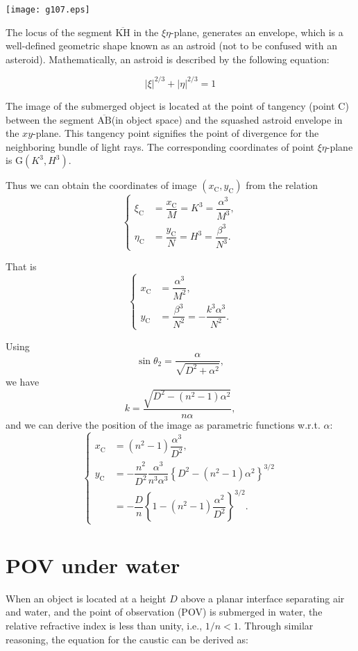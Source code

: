 \documentclass[twocolumn]{article}
\begin{document}
\hfill \texttt{[image: g107.eps]} \hfill\null

The locus of the segment $\overline{\mathrm{KH}}$ in the $\xi\eta$-plane, generates an envelope, which is a 
well-defined geometric shape known as an astroid (not to be confused with an asteroid). 
Mathematically, an astroid is described by the following equation:

$$ \left| \xi \right|^{2/3} + \left| \eta \right|^{2/3} = 1 $$

The image of the submerged object is located at the point of tangency (point $\mathrm{C}$) 
between the segment $\overline{\mathrm{AB}}$(in object space) and the squashed astroid 
envelope in the $xy$-plane. This tangency point signifies the point of divergence for the 
neighboring bundle of light rays. The corresponding coordinates of point $\xi\eta$-plane is 
$\mathrm{G}(K^3, H^3)$.

Thus we can obtain the coordinates of image $(x_{\mathrm{C}}^{}, y_{\mathrm{C}}^{})$ 
from the relation
$$ \left\{ 
\begin{aligned}
	\xi_{\mathrm{C}}^{} &= \dfrac{x_{\mathrm{C}}^{}}{M} = K^3 = \dfrac{\alpha^3}{M^3},\\
	\eta_{\mathrm{C}}^{} &= \dfrac{y_{\mathrm{C}}^{}}{N} = H^3 = \dfrac{\beta^3}{N^3}.
\end{aligned}
\right.$$

That is
$$ \left\{ 
\begin{aligned}
	x_{\mathrm{C}}^{} &= \dfrac{\alpha^3}{M^2},\\
	y_{\mathrm{C}}^{} &= \dfrac{\beta^3}{N^2}=-\dfrac{k^3\alpha^3}{N^2}.
\end{aligned}
\right.$$

Using 
$$\sin\theta_2 = \dfrac{\alpha}{\sqrt{D^2+\alpha^2}},$$
we have
$$k = \dfrac{\sqrt{D^2-(n^2-1)\alpha^2}}{n\alpha},$$
and we can derive the position of the image as parametric functions w.r.t. $\alpha$:
$$ \left\{ 
\begin{aligned}
	x_{\mathrm{C}}^{} &= (n^2-1)\dfrac{\alpha^3}{D^2},\\
	y_{\mathrm{C}}^{} &= -\dfrac{n^2}{D^2}\dfrac{\alpha^3}{n^3\alpha^3}\left\{ D^2-(n^2-1)\alpha^2 \right\}^{3/2}\\
	&=-\dfrac{D}{n}\left\{ 1-(n^2-1)\dfrac{\alpha^2}{D^2} \right\}^{3/2}.
\end{aligned}
\right.$$

\section{POV under water}
When an object is located at a height $D$ above a planar interface separating 
air and water, and the point of observation (POV) is submerged in water, the 
relative refractive index is less than unity, i.e., $1/n < 1$. Through similar 
reasoning, the equation for the caustic can be derived as:
\end{document}
